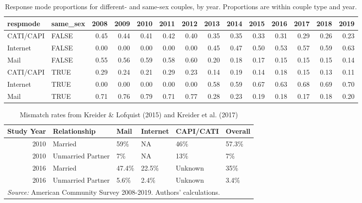 \documentclass[
  11pt,
]{article}
\begin{document}
\begin{table}[!h]

\caption{\label{tab:respmode}Response mode proportions for different- and same-sex couples, by year. Proportions are within couple type and year.}
\centering
\fontsize{9}{11}\selectfont
\begin{tabular}[t]{llrrrrrrrrrrrr}
\toprule
respmode & same\_sex & 2008 & 2009 & 2010 & 2011 & 2012 & 2013 & 2014 & 2015 & 2016 & 2017 & 2018 & 2019\\
\midrule
CATI/CAPI & FALSE & 0.45 & 0.44 & 0.41 & 0.42 & 0.40 & 0.35 & 0.35 & 0.33 & 0.31 & 0.29 & 0.26 & 0.23\\
Internet & FALSE & 0.00 & 0.00 & 0.00 & 0.00 & 0.00 & 0.45 & 0.47 & 0.50 & 0.53 & 0.57 & 0.59 & 0.63\\
Mail & FALSE & 0.55 & 0.56 & 0.59 & 0.58 & 0.60 & 0.20 & 0.18 & 0.17 & 0.15 & 0.15 & 0.15 & 0.14\\
CATI/CAPI & TRUE & 0.29 & 0.24 & 0.21 & 0.29 & 0.23 & 0.14 & 0.19 & 0.14 & 0.18 & 0.15 & 0.13 & 0.11\\
Internet & TRUE & 0.00 & 0.00 & 0.00 & 0.00 & 0.00 & 0.58 & 0.59 & 0.67 & 0.63 & 0.68 & 0.69 & 0.70\\
\addlinespace
Mail & TRUE & 0.71 & 0.76 & 0.79 & 0.71 & 0.77 & 0.28 & 0.23 & 0.19 & 0.18 & 0.17 & 0.18 & 0.20\\
\bottomrule
\end{tabular}
\end{table}

\begin{table}[!h]

\caption{\label{tab:mismatch}Mismatch rates from Kreider \& Lofquist (2015) and Kreider et al. (2017)}
\centering
\begin{tabular}[t]{rlllll}
\toprule
Study Year & Relationship & Mail & Internet & CAPI/CATI & Overall\\
\midrule
2010 & Married & 59\% & NA & 46\% & 57.3\%\\
2010 & Unmarried Partner & 7\% & NA & 13\% & 7\%\\
2016 & Married & 47.4\% & 22.5\% & Unknown & 35\%\\
2016 & Unmarried Partner & 5.6\% & 2.4\% & Unknown & 3.4\%\\
\bottomrule
\multicolumn{6}{l}{\rule{0pt}{1em}\textit{Source:} American Community Survey 2008-2019. Authors' calculations.}\\
\end{tabular}
\end{table}
\end{document}
